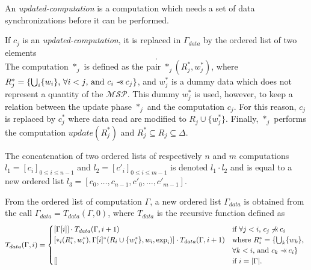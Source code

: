 \begin{mydef}
An \textit{updated-computation} is a computation which needs a set of data synchronizations before it can be performed.
\end{mydef}

\begin{mydef}
If $c_j$ is an \textit{updated-computation}, it is replaced in $\Gamma_{data}$ by the ordered list of two elements
\begin{equation*}
[*_j(R^*_j,w^*_j),c^*_j(R_j \cup \{w^*_j\},w_j,\text{exp}_j)].
\end{equation*}
The computation $*_j$ is defined as the pair $*_j(R^*_j,w^*_j)$, where $R^*_j = \{\bigcup_{i} \{w_i\} \text{, }\forall i<j\text{, and }c_i \pprec c_j\}$, and $w^*_j$ is a dummy data which does not represent a quantity of the $\mathcal{MSP}$. This dummy $w^*_j$ is used, however, to keep a relation between the update phase $*_j$ and the computation $c_j$. For this reason, $c_j$ is replaced by $c^*_j$ where data read are modified to $R_j \cup \{w^*_j\}$. Finally, $*_j$ performs the computation $update(R^*_j)$ and $R^*_j \subseteq R_j \subseteq \Delta$.
\end{mydef}


\begin{mydef}
The concatenation of two ordered lists of respectively $n$ and $m$ computations $l_1=[c_i]_{0 \leq i \leq n-1}$ and $l_2=[c'_i]_{0 \leq i \leq m-1}$ is denoted $l_1 \cdot l_2$ and is equal to a new ordered list $l_3=[c_0,\dots,c_{n-1},c'_0,\dots,c'_{m-1}]$.
\end{mydef}

\begin{mydef}
From the ordered list of computation $\Gamma$, a new ordered list $\Gamma_{data}$ is obtained from the call $\Gamma_{data} = T_{data}(\Gamma,0)$, where $T_{data}$ is the recursive function defined as
\begin{equation*}
T_{data}(\Gamma,i) = 
\begin{cases} 	[\Gamma[i]] \cdot T_{data}(\Gamma,i+1) & \mbox{if }\forall j< i\mbox{, } c_j \not\pprec c_i\\
				[*_i(R^*_i,w^*_i),\Gamma[i]^*(R_i \cup \{w^*_i\},w_i,\text{exp}_i)] \cdot T_{data}(\Gamma,i+1) & \text{where } R^*_i = \{\bigcup_{k} \{w_k\} \text{, }\\
        & \forall k<i\text{, and }c_k \pprec c_i\}\\
				[] & \mbox{if }i=|\Gamma|.
\end{cases}
\end{equation*}
\end{mydef}

